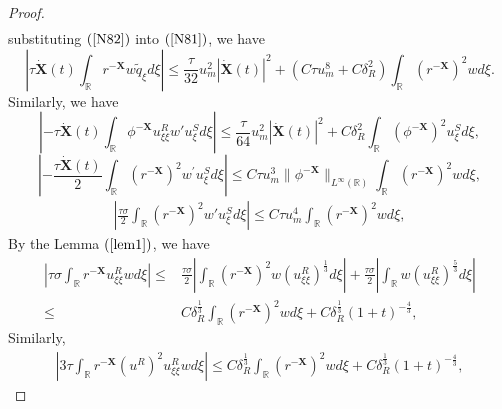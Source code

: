 \documentclass[10pt,reqno]{amsart}
\numberwithin{equation}{section}
\begin{document}
\begin{proof}
\begin{equation}
\begin{aligned}
			\end{aligned}
		\end{equation}
		substituting $(\ref{N82})$ into $(\ref{N81})$, we have
		\begin{equation}\label{N8}
			\left|\tau\dot{\mathbf{X}}(t)\int_{\mathbb{R}}r^{-\mathbf{X}}w\tilde{q}_{\xi}d\xi\right|\leq\frac{\tau}{32}u_m^2\left|\dot{\mathbf{X}}(t)\right|^2+\left(C\tau u_m^8+C\delta_{R}^2\right)\int_{\mathbb{R}}(r^{-\mathbf{X}})^2wd\xi.
		\end{equation}
		Similarly, we have
		\begin{equation}\label{N9}
			\left|-\tau\dot{\mathbf{X}}(t)\int_{\mathbb{R}}\phi^{-\mathbf{X}}u_{\xi\xi}^{R}w'u_{\xi}^{S}d\xi\right|\leq\frac{\tau}{64}u_m^2\left|\dot{\mathbf{X}}(t)\right|^2+C\delta_R^2\int_{\mathbb{R}}(\phi^{-\mathbf{X}})^2u_{\xi}^Sd\xi,
		\end{equation}
		\begin{equation}\label{N10}
			\left|-\frac{\tau\dot{\mathbf{X}}(t)}{2}\int_{\mathbb{R}}\left(r^{-\mathbf{X}}\right)^{2} w^{\prime} u_{\xi}^{S} d \xi\right|\leq C\tau u_m^3\|\phi^{-\mathbf{X}}\|_{L^{\infty}(\mathbb{R})}\int_{\mathbb{R}}(r^{-\mathbf{X}})^2wd\xi,
		\end{equation}
		\begin{equation}\label{N11}
			\begin{aligned}
				\left|\frac{\tau\sigma}{2}\int_{\mathbb{R}}(r^{-\mathbf{X}})^2w'u_{\xi}^Sd\xi\right|\leq C\tau u_m^4\int_{\mathbb{R}}(r^{-\mathbf{X}})^2wd\xi,
			\end{aligned}
		\end{equation}
		By the Lemma $(\ref{lem1})$, we have 
		\begin{equation}\label{N12}
			\begin{aligned}
				\left|\tau\sigma\int_{\mathbb{R}}r^{-\mathbf{X}}u_{\xi\xi}^Rwd\xi\right|\leq& \frac{\tau\sigma}{2}\left|\int_{\mathbb{R}}(r^{-\mathbf{X}})^2w(u_{\xi\xi}^R)^\frac{1}{3}d\xi\right|+\frac{\tau\sigma}{2}\left|\int_{\mathbb{R}}w(u_{\xi\xi}^R)^{\frac{5}{3}}d\xi\right|\\
				\leq&C\delta_R^{\frac{1}{3}}\int_{\mathbb{R}}(r^{-\mathbf{X}})^2wd\xi+C\delta_R^{\frac{1}{3}}(1+t)^{-\frac{4}{3}},
			\end{aligned}
		\end{equation}
		Similarly,
		\begin{equation}\label{N13}
			\begin{aligned}
				\left|3\tau\int_{\mathbb{R}}r^{-\mathbf{X}}(u^R)^2u_{\xi\xi}^Rwd\xi\right|\leq C\delta_R^{\frac{1}{3}}\int_{\mathbb{R}}(r^{-\mathbf{X}})^2wd\xi+C\delta_R^{\frac{1}{3}}(1+t)^{-\frac{4}{3}},

\end{aligned}
\end{equation}
\end{proof}
\end{document}

